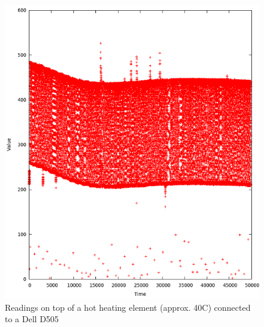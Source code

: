 \documentclass[a4paper]{article}           %
\begin{document}
\begin{figure}[h!]
  \centering  
  \includegraphics[width=0.6\columnwidth]{img/heating.png}
  \caption{Readings on top of a hot heating element (approx. 40C) connected to a Dell D505}
  \label{fig:ard1heat}
\end{figure}

  
\end{document}
